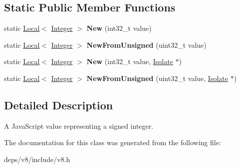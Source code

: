 \subsection*{Static Public Member Functions}
\begin{DoxyCompactItemize}
\item 
\hypertarget{classv8_1_1_integer_a1099725f8f38584a6123ecf0e7a62592}{}static \hyperlink{classv8_1_1_local}{Local}$<$ \hyperlink{classv8_1_1_integer}{Integer} $>$ {\bfseries New} (int32\+\_\+t value)\label{classv8_1_1_integer_a1099725f8f38584a6123ecf0e7a62592}

\item 
\hypertarget{classv8_1_1_integer_ac5fffb125b9469f3321a845838117887}{}static \hyperlink{classv8_1_1_local}{Local}$<$ \hyperlink{classv8_1_1_integer}{Integer} $>$ {\bfseries New\+From\+Unsigned} (uint32\+\_\+t value)\label{classv8_1_1_integer_ac5fffb125b9469f3321a845838117887}

\item 
\hypertarget{classv8_1_1_integer_ad311c6e5dfea52ba3f8468b346c474b6}{}static \hyperlink{classv8_1_1_local}{Local}$<$ \hyperlink{classv8_1_1_integer}{Integer} $>$ {\bfseries New} (int32\+\_\+t value, \hyperlink{classv8_1_1_isolate}{Isolate} $\ast$)\label{classv8_1_1_integer_ad311c6e5dfea52ba3f8468b346c474b6}

\item 
\hypertarget{classv8_1_1_integer_ae8184a2e974c841501e7e5aa1d59e6c4}{}static \hyperlink{classv8_1_1_local}{Local}$<$ \hyperlink{classv8_1_1_integer}{Integer} $>$ {\bfseries New\+From\+Unsigned} (uint32\+\_\+t value, \hyperlink{classv8_1_1_isolate}{Isolate} $\ast$)\label{classv8_1_1_integer_ae8184a2e974c841501e7e5aa1d59e6c4}

\end{DoxyCompactItemize}


\subsection{Detailed Description}
A Java\+Script value representing a signed integer. 

The documentation for this class was generated from the following file\+:\begin{DoxyCompactItemize}
\item 
deps/v8/include/v8.\+h\end{DoxyCompactItemize}
